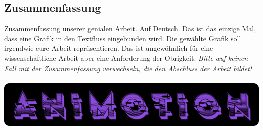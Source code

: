 \newpage
\begin{spacing}{1}
    \chapter*{Zusammenfassung}
\end{spacing}
Zusammenfassung unserer genialen Arbeit. Auf Deutsch.
Das ist das einzige Mal, dass eine Grafik in den Textfluss eingebunden wird.
Die gewählte Grafik soll irgendwie eure Arbeit repräsentieren.
Das ist ungewöhnlich für eine wissenschaftliche Arbeit aber eine Anforderung der Obrigkeit.
\emph{Bitte auf keinen Fall mit der Zusammenfassung verwechseln, die den Abschluss der Arbeit bildet!}
\\
\\
\includegraphics[width=1\textwidth]{pics/animotionlogo.png}
